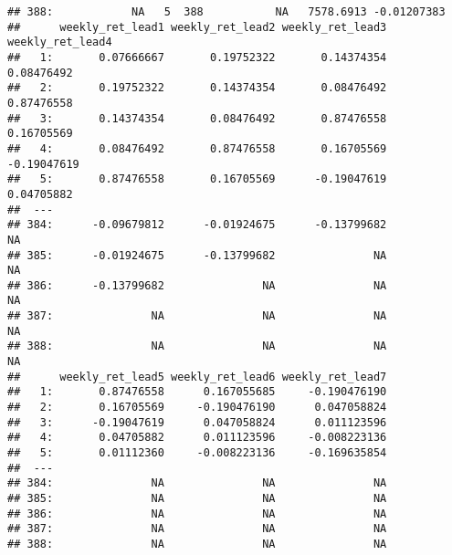 \documentclass[
]{article}
\begin{document}
\begin{verbatim}
## 388:            NA   5  388           NA   7578.6913 -0.01207383
##      weekly_ret_lead1 weekly_ret_lead2 weekly_ret_lead3 weekly_ret_lead4
##   1:       0.07666667       0.19752322       0.14374354       0.08476492
##   2:       0.19752322       0.14374354       0.08476492       0.87476558
##   3:       0.14374354       0.08476492       0.87476558       0.16705569
##   4:       0.08476492       0.87476558       0.16705569      -0.19047619
##   5:       0.87476558       0.16705569      -0.19047619       0.04705882
##  ---                                                                    
## 384:      -0.09679812      -0.01924675      -0.13799682               NA
## 385:      -0.01924675      -0.13799682               NA               NA
## 386:      -0.13799682               NA               NA               NA
## 387:               NA               NA               NA               NA
## 388:               NA               NA               NA               NA
##      weekly_ret_lead5 weekly_ret_lead6 weekly_ret_lead7
##   1:       0.87476558      0.167055685     -0.190476190
##   2:       0.16705569     -0.190476190      0.047058824
##   3:      -0.19047619      0.047058824      0.011123596
##   4:       0.04705882      0.011123596     -0.008223136
##   5:       0.01112360     -0.008223136     -0.169635854
##  ---                                                   
## 384:               NA               NA               NA
## 385:               NA               NA               NA
## 386:               NA               NA               NA
## 387:               NA               NA               NA
## 388:               NA               NA               NA
\end{verbatim}
\end{document}
